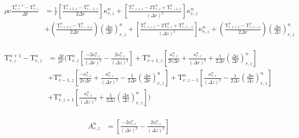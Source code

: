 \documentclass[12pt]{article}
\begin{document}
		\begin{equation}
		\begin{aligned}
		\rho c \frac{\mathrm{T}^{n+1}_{r, z} - \mathrm{T}^{n}_{r, z}}{\Delta t} &= \frac{1}{r} \left [\frac{\mathrm{T}^{n}_{r + 1, z} - \mathrm{T}^{n}_{r - 1, z}}{2\Delta r}  \right ]\kappa^{n}_{r, z} + \left [\frac{\mathrm{T}^{n}_{r + 1, z}  - 2 \mathrm{T}^{n}_{r, z} +  \mathrm{T}^{n}_{r - 1, z}}{(\Delta r)^2} \right ]  \kappa^{n}_{r, z}  \\
		&+ (\frac{\mathrm{T}^{n}_{r + 1, z} - \mathrm{T}^{n}_{r - 1, z}}{2\Delta r}) (\frac{\Delta \kappa}{\Delta r})^n_{r, z}  + \left [\frac{\mathrm{T}^{n}_{r, z + 1}  - 2 \mathrm{T}^{n}_{r, z} +  \mathrm{T}^{n}_{r, z -1}}{(\Delta z)^2} \right ]\kappa^n_{r, z} + (\frac{\mathrm{T}^{n}_{r, z + 1} - \mathrm{T}^{n}_{r, z - 1}}{2\Delta r})(\frac{\Delta \kappa}{\Delta z})^n_{r, z} \\
		\end{aligned}
		\end{equation}
		
		\begin{equation}
		\begin{aligned}
		\mathrm{T}^{n+1}_{r, z} - \mathrm{T}^{n}_{r, z} &= \frac{\Delta t}{\rho c}(\mathrm{T}^{n}_{r, z} \left [\frac{-2\kappa^n_{r, z}}{(\Delta r)^2} -\frac{2\kappa^n_{r, z}}{(\Delta z)^2}  \right ] + \mathrm{T}^{n}_{r + 1, z} \left [\frac{\kappa^n_{r, z}}{2r\Delta r} + \frac{\kappa^n_{r, z}}{(\Delta r)^2} + \frac{1}{2\Delta r}(\frac{\Delta\kappa}{\Delta r})^n_{r, z} \right ] \\
		&+ \mathrm{T}^{n}_{r - 1, z} \left [\frac{-\kappa^n_{r, z}}{2r\Delta r} + \frac{\kappa^n_{r, z}}{(\Delta r)^2} - \frac{1}{2\Delta r}(\frac{\Delta\kappa}{\Delta r})^n_{r, z} \right ] + \mathrm{T}^{n}_{r, z - 1} \left [\frac{\kappa^n_{r, z}}{(\Delta z)^2} - \frac{1}{2\Delta z}(\frac{\Delta\kappa}{\Delta z})^n_{r, z}  \right ] \\
		&+ \mathrm{T}^{n}_{r, z + 1} \left [ \frac{\kappa^n_{r, z}}{(\Delta z)^2} + \frac{1}{2\Delta z}(\frac{\Delta\kappa}{\Delta z})^n_{r, z} \right ]) \\
		\end{aligned}
		\end{equation}
		
		
		\begin{equation}
		\begin{aligned}
		A^n_{r, z} &= \left [\frac{-2\kappa^n_{r, z}}{(\Delta r)^2} -\frac{2\kappa^n_{r, z}}{(\Delta z)^2}  \right ] \\
		\end{aligned}
		\end{equation}
		
\end{document}
